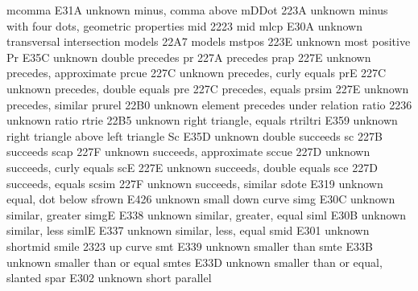  mcomma                E31A {unknown} minus, comma above
 mDDot                 223A {unknown} minus with four dots, geometric properties
 mid                   2223 {\mid} mid
 mlcp                  E30A {unknown} transversal intersection
 models                22A7 {\models} models
 mstpos                223E {unknown} most positive
 Pr                    E35C {unknown} double precedes
 pr                    227A {\prec} precedes
 prap                  227E {unknown} precedes, approximate
 prcue                 227C {unknown} precedes, curly equals
 prE                   227C {unknown} precedes, double equals
 pre                   227C {\preceq} precedes, equals
 prsim                 227E {unknown} precedes, similar
 prurel                22B0 {unknown} element precedes under relation
 ratio                 2236 {unknown} ratio
 rtrie                 22B5 {unknown} right triangle, equals
 rtriltri              E359 {unknown} right triangle above left triangle
 Sc                    E35D {unknown} double succeeds
 sc                    227B {\succ} succeeds
 scap                  227F {unknown} succeeds, approximate
 sccue                 227D {unknown} succeeds, curly equals
 scE                   227E {unknown} succeeds, double equals
 sce                   227D {\succeq} succeeds, equals
 scsim                 227F {unknown} succeeds, similar
 sdote                 E319 {unknown} equal, dot below
 sfrown                E426 {unknown} small down curve
 simg                  E30C {unknown} similar, greater
 simgE                 E338 {unknown} similar, greater, equal
 siml                  E30B {unknown} similar, less
 simlE                 E337 {unknown} similar, less, equal
 smid                  E301 {unknown} shortmid
 smile                 2323 {\smile} up curve
 smt                   E339 {unknown} smaller than
 smte                  E33B {unknown} smaller than or equal
 smtes                 E33D {unknown} smaller than or equal, slanted
 spar                  E302 {unknown} short parallel
